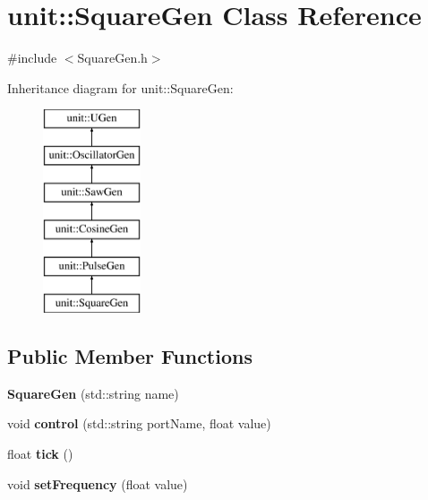 \hypertarget{classunit_1_1SquareGen}{\section{unit\-:\-:Square\-Gen Class Reference}
\label{classunit_1_1SquareGen}
}


{\ttfamily \#include $<$Square\-Gen.\-h$>$}

Inheritance diagram for unit\-:\-:Square\-Gen\-:\begin{figure}[H]
\begin{center}
\leavevmode
\includegraphics[height=6.000000cm]{classunit_1_1SquareGen}
\end{center}
\end{figure}
\subsection*{Public Member Functions}
\begin{DoxyCompactItemize}
\item 
\hypertarget{classunit_1_1SquareGen_a626505e8ade08b9383acda8901aa23b5}{{\bfseries Square\-Gen} (std\-::string name)}\label{classunit_1_1SquareGen_a626505e8ade08b9383acda8901aa23b5}

\item 
\hypertarget{classunit_1_1SquareGen_a8a25dc2b8c5d1ec7857e4da7ec96cecc}{void {\bfseries control} (std\-::string port\-Name, float value)}\label{classunit_1_1SquareGen_a8a25dc2b8c5d1ec7857e4da7ec96cecc}

\item 
\hypertarget{classunit_1_1SquareGen_a119ab47582ee5814687b87db6a71644c}{float {\bfseries tick} ()}\label{classunit_1_1SquareGen_a119ab47582ee5814687b87db6a71644c}

\item 
\hypertarget{classunit_1_1SquareGen_a437dde2e640bc9267d937ae3058777de}{void {\bfseries set\-Frequency} (float value)}\label{classunit_1_1SquareGen_a437dde2e640bc9267d937ae3058777de}

\end{DoxyCompactItemize}
